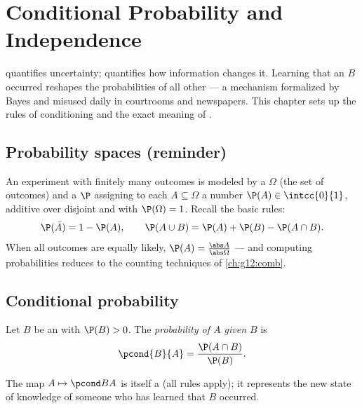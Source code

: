 \chapter{Conditional Probability and Independence}\label{ch:g12:condprob}

 quantifies uncertainty;  quantifies how
information changes it. Learning that an  $B$ occurred reshapes the
probabilities of all other  --- a mechanism formalized by Bayes and
misused daily in courtrooms and newspapers. This chapter sets up the rules
of conditioning and the exact meaning of .

\section{Probability spaces (reminder)}

An experiment with finitely many outcomes is modeled by a \emph{} $\Omega$ (the set of outcomes) and a  $\P$ assigning to
each  $A \subseteq \Omega$ a number $\P(A) \in \intcc{0}{1}$, additive
over disjoint  and with $\P(\Omega) = 1$. Recall the basic rules:
\[
\P(\bar A) = 1 - \P(A),
\qquad
\P(A \cup B) = \P(A) + \P(B) - \P(A \cap B).
\]
When all outcomes are equally likely,
$\P(A) = \frac{\abs A}{\abs\Omega}$ --- and computing probabilities reduces
to the counting techniques of \cref{ch:g12:comb}.

\section{Conditional probability}

\begin{definition}\label{def:g12:condprob:cond}
Let $B$ be an  with $\P(B) > 0$. The \emph{probability of $A$ given
$B$} is
\[
\pcond{B}{A} = \frac{\P(A \cap B)}{\P(B)} .
\]
\end{definition}

The map $A \mapsto \pcond BA$ is itself a  (all rules apply); it
represents the new state of knowledge of someone who has learned that $B$
occurred.

